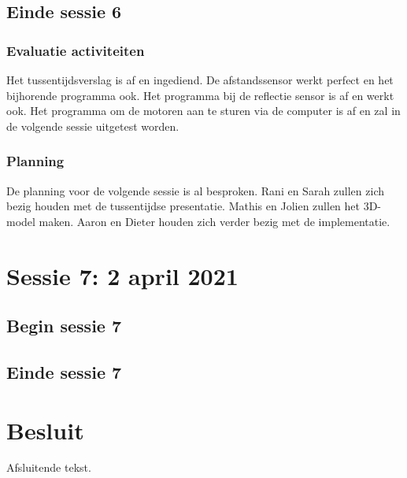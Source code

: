 \documentclass[a4paper,twoside,kulak]{kulakreport} %
\begin{document}
\section{Einde sessie 6}
\subsection{Evaluatie activiteiten}
Het tussentijdsverslag is af en ingediend. De afstandssensor werkt perfect en het bijhorende programma ook. Het programma bij de reflectie sensor is af en werkt ook. Het programma om de motoren aan te sturen via de computer is af en zal in de volgende sessie uitgetest worden.
\subsection{Planning}
De planning voor de volgende sessie is al besproken. Rani en Sarah zullen zich bezig houden met de tussentijdse presentatie. Mathis en Jolien zullen het 3D-model maken. Aaron en Dieter houden zich verder bezig met de implementatie.

\chapter{Sessie 7: 2 april 2021}
\section{Begin sessie 7}

\section{Einde sessie 7}












\chapter*{Besluit}
Afsluitende tekst.
\end{document}
